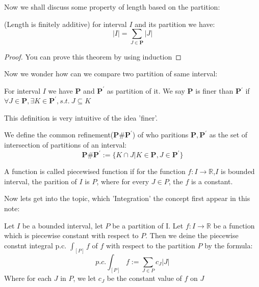 \documentclass{article}
\newcommand{\R}{\mathbb{R}}
\begin{document}
Now we shall discuss some property of length based on the partition:
\begin{theorem}
	(Length is finitely additive) for interval $I$ and its partition we have:
	\begin{equation*}
		|I| = \sum_{J\in \textbf{P}} |J|
	\end{equation*}
\end{theorem}

\begin{proof}
	You can prove this theorem by using induction
\end{proof}

Now we wonder how can we compare two partition of same interval:
\begin{definition}
	For interval $I$ we have \textbf{P} and $\textbf{P}^{'}$ as partition of it. We say \textbf{P} is finer than \textbf{P}$^{'}$ if $\forall J\in \textbf{P}, \exists K\in \textbf{P}^{'},s.t. \ J\subseteq K$
\end{definition}

This definition is very intuitive of the idea 'finer'. 
\begin{definition}
	We define the common refinement($\textbf{P}\#\textbf{P}^{'}$) of who paritions $\textbf{P},\textbf{P}^{'}$ as the set of intersection of partitions of an interval:
	\begin{equation*}
		\textbf{P}\#\textbf{P}^{'}:=\{K\cap J|K\in \textbf{P},J\in \textbf{P}^{'}\}
	\end{equation*}
\end{definition}

\begin{definition}
	A function is called piecewised function if for the function $f:I\to \R$,$I$ is bounded interval, the parition of $I$ is $P$, where for every $J\in P$, the $f$ is a constant. 
\end{definition}

Now lets get into the topic, which 'Integration' the concept first appear in this note:
\begin{definition}
	Let $I$ be a bounded interval, let $P$ be a partition of I. Let $f:I\to \R$ be a function which is piecewise constant with respect to $P$. Then we deine the piecewise constnt integral p.c. $\int_{[P]}f$ of $f$ with respect to the partition $P$ by the formula:
	\begin{equation*}
		p.c.\int_{[P]}f:=\sum_{J\in P}c_J|J|
	\end{equation*}
	Where for each $J$ in $P$, we let $c_J$ be the constant value of $f$ on $J$
\end{definition}
\end{document}
